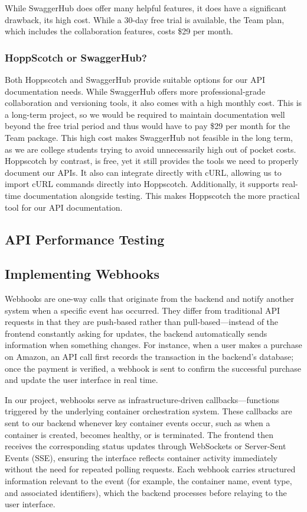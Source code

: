 \documentclass[12pt]{article}
\begin{document}
While SwaggerHub does offer many helpful features, it does have a significant drawback, its high cost. While a 30-day free trial is available, the Team plan, which includes the collaboration features, costs \$29 per month.

\subsubsection{HoppScotch or SwaggerHub?}
Both Hoppscotch and SwaggerHub provide suitable options for our API documentation needs. While SwaggerHub offers more professional-grade collaboration and versioning tools, it also comes with a high monthly cost. This is a long-term project, so we would be required to maintain documentation well beyond the free trial period and thus would have to pay \$29 per month for the Team package. This high cost makes SwaggerHub not feasible in the long term, as we are college students trying to avoid unnecessarily high out of pocket costs. Hoppscotch by contrast, is free, yet it still provides the tools we need to properly document our APIs. It also can integrate directly with cURL, allowing us to import cURL commands directly into Hoppscotch. Additionally, it supports real-time documentation alongside testing. This makes Hoppscotch the more practical tool for our API documentation.
\subsection{API Performance Testing}

\subsection{Implementing Webhooks}
Webhooks are one-way calls that originate from the backend and notify another system when a specific event has occurred. They differ from traditional API requests in that they are push-based rather than pull-based—instead of the frontend constantly asking for updates, the backend automatically sends information when something changes. For instance, when a user makes a purchase on Amazon, an API call first records the transaction in the backend’s database; once the payment is verified, a webhook is sent to confirm the successful purchase and update the user interface in real time.

In our project, webhooks serve as infrastructure-driven callbacks—functions triggered by the underlying container orchestration system. These callbacks are sent to our backend whenever key container events occur, such as when a container is created, becomes healthy, or is terminated. The frontend then receives the corresponding status updates through WebSockets or Server-Sent Events (SSE), ensuring the interface reflects container activity immediately without the need for repeated polling requests. Each webhook carries structured information relevant to the event (for example, the container name, event type, and associated identifiers), which the backend processes before relaying to the user interface.
\end{document}
